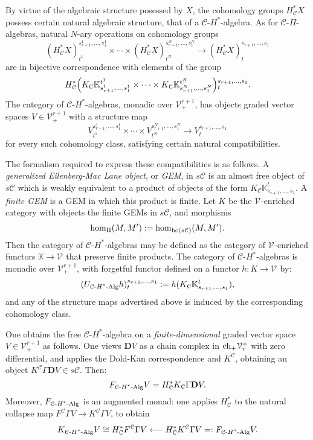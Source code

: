 \documentclass[11pt]{amsart}
\theoremstyle{plain}
\theoremstyle{definition}
\renewcommand{\to}{\longrightarrow}
\newcommand{\from}{\longleftarrow}
\newcommand{\calC}{\mathcal{C}}
\newcommand{\calV}{\mathcal{V}}
\newcommand{\calc}{\mathcal{C}}
\theoremstyle{plain}
\newcommand{\vect}[2]{\calV^{#1}_{#2}}
\newcommand{\HAlg}{\textup{-$H^*$-Alg}}
\newcommand{\complexes}{\textup{ch}_+}
\newcommand{\dual}{\mathbf{D}}
\begin{document}
\begin{CPiAlgs and CHalgs}
By virtue of the algebraic structure posessed by $X$, the cohomology groups $H_\calc^*X$ possess certain natural algebraic structure, that of a $\calc$-$H^*$-algebra.  As for $\calc$-$\Pi$-algebras, natural $N$-ary operations on cohomology groups
\[(H^*_\calc X)^{s_{r+1}^{1},\ldots,s_{1}^{1}}_{t^1}\times\cdots \times(H^*_\calc X)^{s_{r+1}^{N},\ldots,s_{1}^{N}}_{t^N}\to (H^*_\calc X)^{s_{r+1},\ldots,s_{1}}_{t}\]
are in bijective correspondence with elements of the group
\[ H^*_\calc\Bigl(K_\calC\mathbb{K}_{s_{r+1}^{1},\ldots,s_{1}^{1}}^{t^1}\times\cdots\times K_\calC\mathbb{K}_{s_{r+1}^{N},\ldots,s_{1}^{N}}^{t^N}\Bigr)\makebox[0cm][l]{}^{s_{r+1},\ldots,s_{1}}_{t}.\]
The category of $\calC$-$H^*$-algebras, monadic over $\vect{r+1}{+}$, has objects graded vector spaces $V\in\vect{r+1}{+}$ with a structure map 
\[V^{s_{r+1}^{1},\ldots,s_{1}^{1}}_{t^1}\times\cdots \times V^{s_{r+1}^{N},\ldots,s_{1}^{N}}_{t^N}\to V^{s_{r+1},\ldots,s_{1}}_{t}\]
for every such cohomology class, satisfying certain natural compatibilities.

The formalism required to express these compatibilities is as follows. A \emph{generalized Eilenberg-Mac Lane object}, or \emph{GEM}, in $s\calc$ is an almost free object of $s\calc$ which is weakly equivalent to a product of objects of the form $K_\calC\mathbb{K}_{s_{r+1},\ldots,s_{1}}^{t}$. A \emph{finite GEM} is a GEM in which this product is finite. Let $K$  be the $\vect{}{}$-enriched category with objects the finite GEMs in $s\calc$, and morphisms
\[\hom_{\Pi}(M,M'):=\hom_{\textup{ho}(s\calc)}(M,M').\]
Then the category of $\calc$-$H^*$-algebras  may be defined as the category of $\vect{}{}$-enriched functors $\mathbb{K}\to \vect{}{}$ that preserve finite products. The category of $\calc$-$H^*$-algebras is monadic over $\vect{r+1}{+}$, with forgetful functor defined  on a functor $h:K\to \vect{}{}$  by:%
\[(U_{\calc\HAlg}h)_t^{s_{r+1},\ldots,s_1}:=h(K_\calC\mathbb{K}_{s_{r+1},\ldots,s_{1}}^{t}),\]
and any of the structure maps advertised above is induced by the corresponding cohomology class. %

One obtains the free $\calc$-$H^*$-algebra on a \emph{finite-dimensional} graded vector space $V\in \vect{r+1}{+}$ as follows. One views $\dual V$ as a chain complex in $\complexes\vect{+}{r}$ with zero differential, and applies the Dold-Kan correspondence and $K^\calc$, obtaining an object $K^\calc\Gamma \dual V\in s\calc$. Then:
\[F_{\calc\HAlg}V=H^*_{\calc}K_\calc\Gamma\dual V.\]
Moreover, $F_{\calc\HAlg}$ is an augmented monad: one applies $H^*_{\calc}$ to the natural collapse map $F^{\calc}\Gamma V\to K^{\calc}\Gamma V$, to obtain
\[K_{\calc\HAlg}V\cong H^*_{\calc} F^{\calc}\Gamma V\from H^*_{\calc} K^{\calc}\Gamma V=:F_{\calc\HAlg}V.\]


\end{CPiAlgs and CHalgs}
\end{document}
